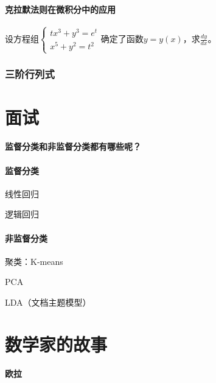 \documentclass[UTF8]{ctexbook}
\begin{document}
\subsection{克拉默法则在微积分中的应用}

设方程组$\begin{cases}
tx^{3}+y^{3}=e^{t}\\
x^{5}+y^{2}=t^{2}
\end{cases}$确定了函数$y=y(x)$，求$\frac{dy}{dx}$。

\section{三阶行列式}


\part{面试}

\subsection{监督分类和非监督分类都有哪些呢？}

\subsection{监督分类}

线性回归

逻辑回归


\subsection{非监督分类}

聚类：K-means

PCA

LDA（文档主题模型）

\part{数学家的故事}

\subsection{欧拉}
\end{document}

